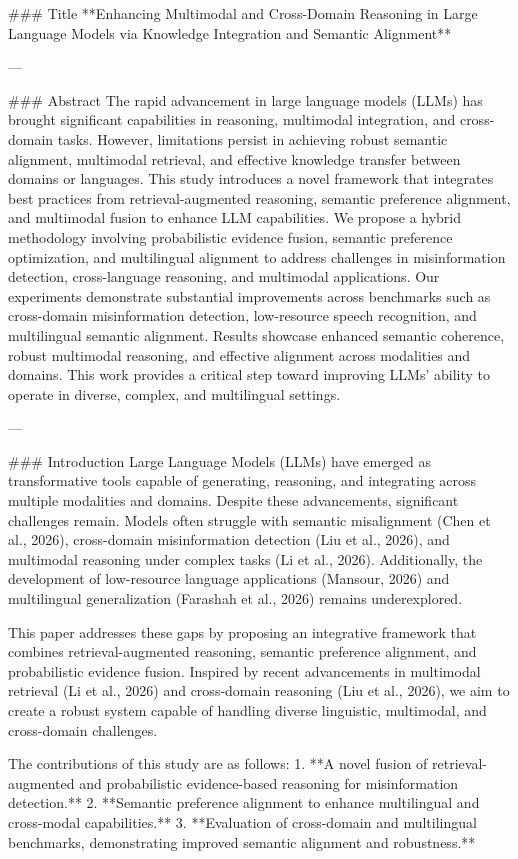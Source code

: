 ### Title  
**Enhancing Multimodal and Cross-Domain Reasoning in Large Language Models via Knowledge Integration and Semantic Alignment**

---

### Abstract  
The rapid advancement in large language models (LLMs) has brought significant capabilities in reasoning, multimodal integration, and cross-domain tasks. However, limitations persist in achieving robust semantic alignment, multimodal retrieval, and effective knowledge transfer between domains or languages. This study introduces a novel framework that integrates best practices from retrieval-augmented reasoning, semantic preference alignment, and multimodal fusion to enhance LLM capabilities. We propose a hybrid methodology involving probabilistic evidence fusion, semantic preference optimization, and multilingual alignment to address challenges in misinformation detection, cross-language reasoning, and multimodal applications. Our experiments demonstrate substantial improvements across benchmarks such as cross-domain misinformation detection, low-resource speech recognition, and multilingual semantic alignment. Results showcase enhanced semantic coherence, robust multimodal reasoning, and effective alignment across modalities and domains. This work provides a critical step toward improving LLMs' ability to operate in diverse, complex, and multilingual settings.

---

### Introduction  
Large Language Models (LLMs) have emerged as transformative tools capable of generating, reasoning, and integrating across multiple modalities and domains. Despite these advancements, significant challenges remain. Models often struggle with semantic misalignment (Chen et al., 2026), cross-domain misinformation detection (Liu et al., 2026), and multimodal reasoning under complex tasks (Li et al., 2026). Additionally, the development of low-resource language applications (Mansour, 2026) and multilingual generalization (Farashah et al., 2026) remains underexplored.

This paper addresses these gaps by proposing an integrative framework that combines retrieval-augmented reasoning, semantic preference alignment, and probabilistic evidence fusion. Inspired by recent advancements in multimodal retrieval (Li et al., 2026) and cross-domain reasoning (Liu et al., 2026), we aim to create a robust system capable of handling diverse linguistic, multimodal, and cross-domain challenges.

The contributions of this study are as follows:  
1. **A novel fusion of retrieval-augmented and probabilistic evidence-based reasoning for misinformation detection.**  
2. **Semantic preference alignment to enhance multilingual and cross-modal capabilities.**  
3. **Evaluation of cross-domain and multilingual benchmarks, demonstrating improved semantic alignment and robustness.**  

